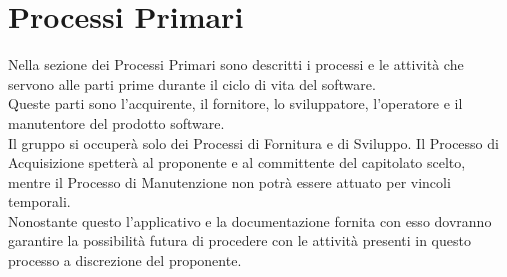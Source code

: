 %



\section{Processi Primari}
Nella sezione dei Processi Primari sono descritti i processi e le attività che servono alle parti prime durante il ciclo di vita del software. \\
Queste parti sono l'acquirente, il fornitore, lo sviluppatore, l'operatore e il manutentore del prodotto software. \\
Il gruppo \groupName{} si occuperà solo dei Processi di Fornitura e di Sviluppo. Il Processo di Acquisizione spetterà al proponente e al committente del capitolato scelto, mentre il Processo di Manutenzione non potrà essere attuato per vincoli temporali. \\
Nonostante questo l'applicativo \projectName{} e la documentazione fornita con esso dovranno garantire la possibilità futura di procedere con le attività presenti in questo processo a discrezione del proponente.

